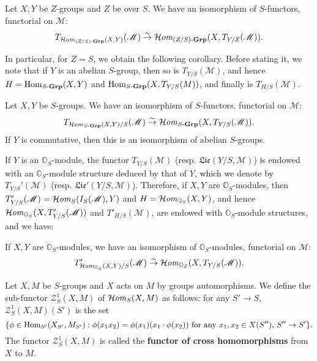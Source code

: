 \begin{proposition}\label{scheme group tangent bundle of sHom_Z/S isomorphism}
Let $X,Y$ be $Z$-groups and $Z$ be over $S$. We have an isomorphism of $S$-functors, functorial on $\mathscr{M}$:
\[T_{\operatorname{\mathcal{H}\hspace*{-0.4pt}\textit{om}\hspace{0.5pt}}_{(Z/S)\textup{-}\mathbf{Grp}}(X,Y)}(\mathscr{M})\stackrel{\sim}{\to}\operatorname{\mathcal{H}\hspace*{-0.4pt}\textit{om}\hspace{0.5pt}}_{(Z/S)\textup{-}\mathbf{Grp}}(X,T_{Y/Z}(\mathscr{M})).\]
\end{proposition}

In particular, for $Z=S$, we obtain the following corollary. Before stating it, we note that if $Y$ is an abelian $S$-group, then so is $T_{Y/S}(\mathscr{M})$, and hence $H=\mathrm{Hom}_{S\textup{-}\mathbf{Grp}}(X,Y)$ and $\mathrm{Hom}_{S\textup{-}\mathbf{Grp}}(X,T_{Y/S}(M))$, and finally is $T_{H/S}(\mathscr{M})$.

\begin{corollary}\label{scheme group tangent bundle of sHom isomorphism}
Let $X,Y$ be $S$-groups. We have an isomorphism of $S$-functors, functorial on $\mathscr{M}$:
\[T_{\operatorname{\mathcal{H}\hspace*{-0.4pt}\textit{om}\hspace{0.5pt}}_{S\textup{-}\mathbf{Grp}}(X,Y)/S}(\mathscr{M})\stackrel{\sim}{\to} \operatorname{\mathcal{H}\hspace*{-0.4pt}\textit{om}\hspace{0.5pt}}_{S\textup{-}\mathbf{Grp}}(X,T_{Y/S}(\mathscr{M})).\]
If $Y$ is commutative, then this is an isomorphism of abelian $S$-groups.
\end{corollary}

If $Y$ is an $\mathbb{O}_S$-module, the functor $T_{Y/S}(\mathscr{M})$ (resp. $\mathfrak{Lie}(Y/S,\mathscr{M})$) is endowed with an $\mathbb{O}_S$-module structure deduced by that of $Y$, which we denote by $T_{Y/S}'(\mathscr{M})$ (resp. $\mathfrak{Lie}'(Y/S,\mathscr{M})$). Therefore, if $X,Y$ are $\mathbb{O}_S$-modules, then $T_{Y/S}'(\mathscr{M})=\operatorname{\mathcal{H}\hspace*{-0.4pt}\textit{om}\hspace{0.5pt}}_S(I_S(\mathscr{M}),Y)$ and $H=\operatorname{\mathcal{H}\hspace*{-0.4pt}\textit{om}\hspace{0.5pt}}_{\mathbb{O}_S}(X,Y)$, and hence $\operatorname{\mathcal{H}\hspace*{-0.4pt}\textit{om}\hspace{0.5pt}}_{\mathbb{O}_S}(X,T'_{Y/S}(\mathscr{M}))$ and $T'_{H/S}(\mathscr{M})$, are endowed with $\mathbb{O}_S$-module structures, and we have:

\begin{corollary}\label{scheme group tangent bundle of sHom O_S-module isomorphism}
If $X,Y$ are $\mathbb{O}_S$-modules, we have an isomorphism of $\mathbb{O}_S$-modules, functorial on $\mathscr{M}$:
\[T'_{\operatorname{\mathcal{H}\hspace*{-0.4pt}\textit{om}\hspace{0.5pt}}_{\mathbb{O}_S}(X,Y)/S}(\mathscr{M})\stackrel{\sim}{\to} \operatorname{\mathcal{H}\hspace*{-0.4pt}\textit{om}\hspace{0.5pt}}_{\mathbb{O}_S}(X,T_{Y/S}(\mathscr{M})).\]
\end{corollary}

\begin{definition}
Let $X,M$ be $S$-groups and $X$ acts on $M$ by groups automorphisms. We define the sub-functor $\mathcal{Z}_S^1(X,M)$ of $\operatorname{\mathcal{H}\hspace*{-0.4pt}\textit{om}\hspace{0.5pt}}_S(X,M)$ as follows: for any $S'\to S$, $\mathcal{Z}_S^1(X,M)(S')$ is the set
\[\{\phi\in\mathrm{Hom}_{S'}(X_{S'},M_{S'}):\text{$\phi(x_1x_2)=\phi(x_1)(x_1\cdot\phi(x_2))$ for any $x_1,x_2\in X(S'')$, $S''\to S'$}\}.\]
The functor $\mathcal{Z}_S^1(X,M)$ is called the \textbf{functor of cross homomorphisms} from $X$ to $M$.
\end{definition}

